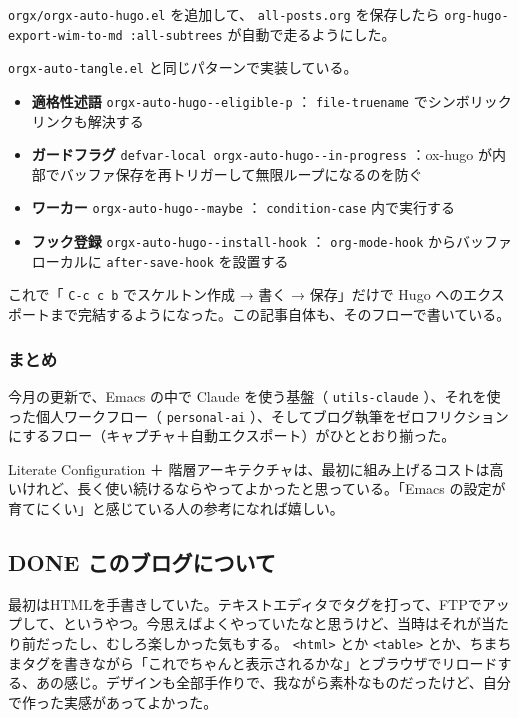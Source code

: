 \documentclass[11pt]{article}
\begin{document}
\begin{enumerate}
\texttt{orgx/orgx-auto-hugo.el} を追加して、 \texttt{all-posts.org} を保存したら \texttt{org-hugo-export-wim-to-md :all-subtrees} が自動で走るようにした。

\texttt{orgx-auto-tangle.el} と同じパターンで実装している。

\begin{itemize}
\item \textbf{適格性述語} \texttt{orgx-auto-hugo-{}-{}eligible-p} ： \texttt{file-truename} でシンボリックリンクも解決する
\item \textbf{ガードフラグ} \texttt{defvar-local orgx-auto-hugo-{}-{}in-progress} ：ox-hugo が内部でバッファ保存を再トリガーして無限ループになるのを防ぐ
\item \textbf{ワーカー} \texttt{orgx-auto-hugo-{}-{}maybe} ： \texttt{condition-case} 内で実行する
\item \textbf{フック登録} \texttt{orgx-auto-hugo-{}-{}install-hook} ： \texttt{org-mode-hook} からバッファローカルに \texttt{after-save-hook} を設置する
\end{itemize}

これで「 \texttt{C-c c b} でスケルトン作成 → 書く → 保存」だけで Hugo へのエクスポートまで完結するようになった。この記事自体も、そのフローで書いている。
\end{enumerate}
\subsubsection{まとめ}
\label{sec:orgbafd32d}

今月の更新で、Emacs の中で Claude を使う基盤（ \texttt{utils-claude} ）、それを使った個人ワークフロー（ \texttt{personal-ai} ）、そしてブログ執筆をゼロフリクションにするフロー（キャプチャ＋自動エクスポート）がひととおり揃った。

Literate Configuration ＋ 階層アーキテクチャは、最初に組み上げるコストは高いけれど、長く使い続けるならやってよかったと思っている。「Emacs の設定が育てにくい」と感じている人の参考になれば嬉しい。
\subsection{{\bfseries\sffamily DONE} このブログについて}
\label{sec:org3886a54}
最初はHTMLを手書きしていた。テキストエディタでタグを打って、FTPでアップして、というやつ。今思えばよくやっていたなと思うけど、当時はそれが当たり前だったし、むしろ楽しかった気もする。 \texttt{<html>} とか \texttt{<table>} とか、ちまちまタグを書きながら「これでちゃんと表示されるかな」とブラウザでリロードする、あの感じ。デザインも全部手作りで、我ながら素朴なものだったけど、自分で作った実感があってよかった。
\end{document}
